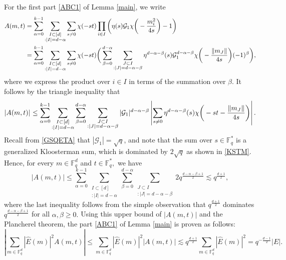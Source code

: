 \documentclass[a4paper,11pt]{amsart}
\numberwithin{equation}{section}
\def\Fq#1{\mathbb{F}_q^{#1}}
\def\norm#1{\left\lVert#1\right\lVert}
\def\pnorm#1#2{|#2|_{#1}}
\begin{document}
For the first part \ref{ABC1} of Lemma  \ref{main}, we write
\begin{align*}
A(m,t)=\sum_{\alpha = 0}^{k-1}\sum_{\substack{{I \subset [d]}\\{:|I| = d-\alpha}}}\sum_{s \neq 0}\chi(-st)&\prod_{i \in I}\bigg(\eta(s)\mathcal{G}_1\chi\bigg{(}-\frac{{m}_i^2}{4s}\bigg{)}-1\bigg)\\
=\sum_{\alpha = 0}^{k-1}\sum_{\substack{{I \subset [d]}\\{:|I| = d-\alpha}}}\sum_{s\neq 0} \chi(-st)&\bigg{(} \sum_{\beta=0}^{d-\alpha}\sum_{\substack{{J \subset I}\\{:|J| = d-\alpha-\beta}}} \eta^{d-\alpha-\beta}(s)\mathcal{G}_1^{d-\alpha-\beta}\chi\bigg{(}-\frac{\norm{m_J}}{4s}\bigg{)}(-1)^{\beta}\bigg{)},\label{Amt:second}
\end{align*}
where  we express the product over $i \in I$ in terms of the summation over $\beta.$ It follows by the triangle inequality that 
\begin{equation*}
\pnorm{}{A(m,t)} \leq \sum_{\alpha = 0}^{k-1}\sum_{\substack{{I \subset [d]}\\{:|I| = d-\alpha}}} \sum_{\beta=0}^{d-\alpha}\sum_{\substack{{J \subset I}\\{:|J| = d-\alpha-\beta}}}\pnorm{}{\mathcal{G}_1}^{d-\alpha-\beta}\left|\sum_{s\neq 0}  \eta^{d-\alpha-\beta}(s)\chi\bigg{(}-st-\frac{\norm{m_J}}{4s}\bigg{)}\right|.
\end{equation*}
Recall from \eqref{GSQETA} that \( |\mathcal{G}_1| = \sqrt{q} \), and note that the sum over \( s \in \mathbb{F}_q^* \) is a generalized Kloosterman sum, which is dominated by \( 2\sqrt{q} \) as shown in \eqref{KSTM}. Hence,  for every $m\in \mathbb F_q^d$ and $t\in \mathbb F_q^*,$  we have
$$ |A(m, t)| \leq  \sum_{\alpha = 0}^{k-1}\sum_{\substack{{I \subset [d]}\\{:|I| = d-\alpha}}} \sum_{\beta=0}^{d-\alpha}\sum_{\substack{{J \subset I}\\{:|J| = d-\alpha-\beta}}} 2 q^{\frac{d-\alpha-\beta+1}{2}} \lesssim q^{\frac{d+1}{2}},$$
where the last inequality follows from the simple observation that  $q^{\frac{d+1}{2}}$ dominates  $q^{\frac{d-\alpha-\beta+1}{2}}$ for all $\alpha, \beta\ge 0.$  Using this upper bound of $|A(m, t)|$ and the Plancherel theorem,  the part \ref{ABC1} of Lemma \ref{main} is proven as follows:
$$\left|\displaystyle{\sum_{m\in \Fq{d}}\pnorm{}{\widehat{E}(m)}^2}A(m,t)\right| \leq
\displaystyle{\sum_{m\in \Fq{d}}\pnorm{}{\widehat{E}(m)}^2}|A(m,t)| \lesssim  q^{\frac{d+1}{2}} \sum_{m\in \mathbb F_q^d} |\widehat{E}(m)|^2  = q^{-\frac{d-1}{2}} |E|. $$
\end{document}
